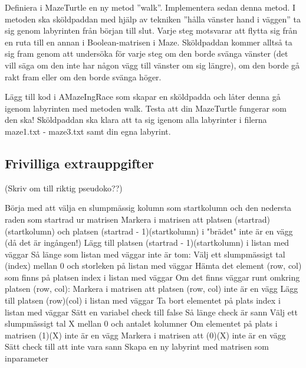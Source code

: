 \Subtask Definiera i MazeTurtle en ny metod ''walk''. Implementera sedan denna metod. I metoden ska sköldpaddan med hjälp av tekniken ''hålla vänster hand i väggen'' ta sig genom labyrinten från början till slut. Varje steg motsvarar att flytta sig från en ruta till en annan i Boolean-matrisen i Maze. Sköldpaddan kommer alltså ta sig fram genom att undersöka för varje steg om den borde svänga vänster (det vill säga om den inte har någon vägg till vänster om sig längre), om den borde gå rakt fram eller om den borde svänga höger.

\Subtask Lägg till kod i AMazeIngRace som skapar en sköldpadda och låter denna gå igenom labyrinten med metoden walk. Testa att din MazeTurtle fungerar som den ska! Sköldpaddan ska klara att ta sig igenom alla labyrinter i filerna maze1.txt - maze3.txt samt din egna labyrint.

\subsection{Frivilliga extrauppgifter}

(Skriv om till riktig pseudoko??)

Börja med att välja en slumpmässig kolumn som startkolumn och den nedersta raden som startrad ur matrisen
Markera i matrisen att platsen (startrad)(startkolumn) och platsen (startrad - 1)(startkolumn) i "brädet" inte är en vägg (då det är ingången!)
Lägg till platsen (startrad - 1)(startkolumn) i listan med väggar
Så länge som listan med väggar inte är tom:
    Välj ett slumpmässigt tal (index) mellan 0 och storleken på listan med väggar
    Hämta det element (row, col) som finns på platsen index i listan med väggar
    Om det finns väggar runt omkring platsen (row, col):
        Markera i matrisen att platsen (row, col) inte är en vägg
        Lägg till platsen (row)(col) i listan med väggar
    Ta bort elementet på plats index i listan med väggar
Sätt en variabel check till false
Så länge check är sann
    Välj ett slumpmässigt tal X mellan 0 och antalet kolumner
    Om elementet på plats i matrisen (1)(X) inte är en vägg
        Markera i matrisen att (0)(X) inte är en vägg
        Sätt check till att inte vara sann
Skapa en ny labyrint med matrisen som inparameter




